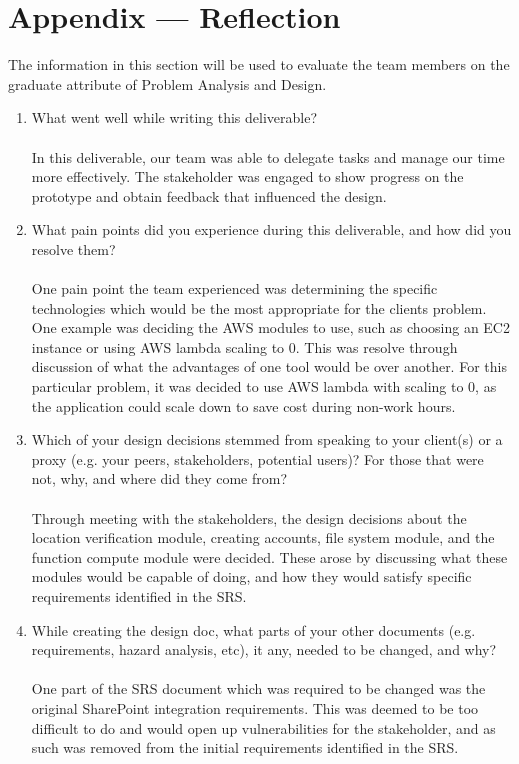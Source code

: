\documentclass[12pt, titlepage]{article}
\begin{document}
\newpage{}

\section*{Appendix --- Reflection}

The information in this section will be used to evaluate the team members on the
graduate attribute of Problem Analysis and Design.



\begin{enumerate}
  \item What went well while writing this deliverable?
  \\
  \\
  In this deliverable, our team was able to delegate tasks and manage our time more effectively. 
  The stakeholder was engaged to show progress on the prototype and obtain feedback that
  influenced the design.

  \item What pain points did you experience during this deliverable, and how
    did you resolve them?
    \\
    \\
    One pain point the team experienced was determining the specific technologies which would be the most appropriate
    for the clients problem. One example was deciding the AWS modules to use, such as choosing an EC2 instance or using AWS lambda scaling to 0.
    This was resolve through discussion of what the advantages of one tool would be over another. For this particular problem,
    it was decided to use AWS lambda with scaling to 0, as the application could scale down to save cost during non-work hours.

  \item Which of your design decisions stemmed from speaking to your client(s)
    or a proxy (e.g. your peers, stakeholders, potential users)? For those that
    were not, why, and where did they come from?
    \\
    \\
    Through meeting with the stakeholders, the design decisions about the location verification module, creating accounts, file system module,
    and the function compute module were decided. These arose by discussing what these modules would be capable of doing, and how they would satisfy specific
    requirements identified in the SRS.

  \item While creating the design doc, what parts of your other documents (e.g.
    requirements, hazard analysis, etc), it any, needed to be changed, and why?
    \\
    \\
    One part of the SRS document which was required to be changed was the original SharePoint integration requirements. This was deemed
    to be too difficult to do and would open up vulnerabilities for the stakeholder, and as such was removed from the initial requirements identified in the SRS.


\end{enumerate}
\end{document}
